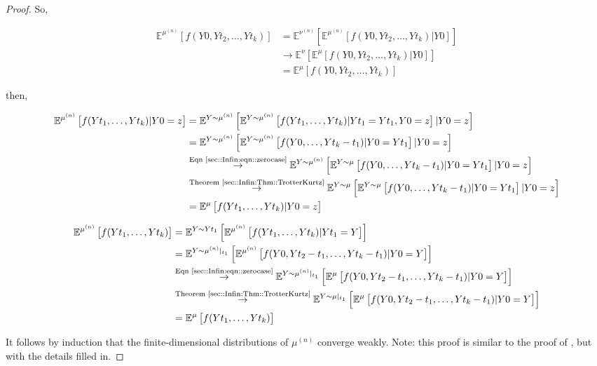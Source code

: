 \documentclass[12pt]{article}
\newcommand{\mb}{\mathbb}
\newcommand{\ra}{\rightarrow}
\newcommand{\os}{\overset}
\newcommand{\te}{\text}
\newcommand{\exmu}[2]{\mb{E}^{#1}\left[#2\right]}	%
\renewcommand{\t}{t}							%
\newcommand{\sln}[1]{^{(#1)}}						%
\newcommand{\indx}[1]{_{#1}}					%
\newcommand{\m}{\mu}							%
\newcommand{\mm}{\nu}							%
\newcommand{\XX}{Y}								%
\renewcommand{\it}{k}							%
\newcommand{\xxx}{z}							%
\begin{document}
\begin{proof}
So,

\begin{align*}
\exmu{\m\sln{n}}{f(\XX{}{0},\XX{}{\t\indx{2}},\dots,\XX{}{\t\indx{\it}})} &= \exmu{\mm\sln{n}}{\exmu{\m\sln{n}}{f(\XX{}{0},\XX{}{\t\indx{2}},\dots,\XX{}{\t\indx{\it}})|\XX{}{0}}}\\
&\ra \exmu{\mm}{\exmu{\m}{f(\XX{}{0},\XX{}{\t\indx{2}},\dots,\XX{}{\t\indx{\it}})|\XX{}{0}}}\\
&= \exmu{\m}{f(\XX{}{0},\XX{}{\t\indx{2}},\dots,\XX{}{\t\indx{\it}})}
\end{align*}

then,

\begin{align*}
\exmu{\m\sln{n}}{f(\XX{}{\t\indx{1}},\dots,\XX{}{\t\indx{\it}})|\XX{}{0}=\xxx}&=\exmu{\XX\sim\m\sln{n}}{\exmu{\XX\sim \m\sln{n}}{f(\XX{\t\indx{1}},\dots,\XX{\t\indx{\it}})|\XX{\t\indx{1}}=\XX{}{\t\indx{1}},\XX{0}=\xxx}|\XX{}{0}=\xxx}\\
&=\exmu{\XX\sim\m\sln{n}}{\exmu{\XX\sim \m\sln{n}}{f(\XX{0},\dots,\XX{\t\indx{\it}-\t\indx{1}})|\XX{0}=\XX{}{\t\indx{1}}}|\XX{}{0}=\xxx}\\
&\os{\te{Eqn \eqref{sec::Infin:eqn::zerocase}}}{\ra} \exmu{\XX\sim\m\sln{n}}{\exmu{\XX\sim \m}{f(\XX{0},\dots,\XX{\t\indx{\it}-\t\indx{1}})|\XX{0}=\XX{}{\t\indx{1}}}|\XX{}{0}=\xxx}\\
&\os{\te{Theorem \ref{sec::Infin:Thm::TrotterKurtz}}}{\ra} \exmu{\XX\sim\m}{\exmu{\XX\sim \m}{f(\XX{0},\dots,\XX{\t\indx{\it}-\t\indx{1}})|\XX{0}=\XX{}{\t\indx{1}}}|\XX{}{0}=\xxx}\\
&=\exmu{\m}{f(\XX{}{\t\indx{1}},\dots,\XX{}{\t\indx{\it}})|\XX{}{0}=\xxx}
\end{align*}

\begin{align*}
\exmu{\m\sln{n}}{f(\XX{}{\t\indx{1}},\dots,\XX{}{\t\indx{\it}})}&= \exmu{\XX\sim \XX{}{\t\indx{1}}}{\exmu{\m\sln{n}}{f(\XX{}{\t\indx{1}},\dots,\XX{}{\t\indx{\it}})|\XX{}{\t\indx{1}}=\XX}}\\
&=\exmu{\XX\sim \m\sln{n}|_{\t\indx{1}}}{\exmu{\m\sln{n}}{f(\XX{}{0},\XX{\t\indx{2}-\t\indx{1}},\dots,\XX{\t\indx{\it}-\t\indx{1}})|\XX{}{0}=\XX}}\\
&\os{\te{Eqn \eqref{sec::Infin:eqn::zerocase}}}{\ra} \exmu{\XX\sim \m\sln{n}|_{\t\indx{1}}}{\exmu{\m}{f(\XX{}{0},\XX{\t\indx{2}-\t\indx{1}},\dots,\XX{\t\indx{\it}-\t\indx{1}})|\XX{}{0}=\XX}}\\
&\os{\te{Theorem \ref{sec::Infin:Thm::TrotterKurtz}}}{\ra} \exmu{\XX\sim \m|_{\t\indx{1}}}{\exmu{\m}{f(\XX{}{0},\XX{\t\indx{2}-\t\indx{1}},\dots,\XX{\t\indx{\it}-\t\indx{1}})|\XX{}{0}=\XX}}\\
&=\exmu{\m}{f(\XX{}{\t\indx{1}},\dots,\XX{}{\t\indx{\it}})}
\end{align*}

It follows by induction that the finite-dimensional distributions of \(\m\sln{n}\) converge weakly. Note: this proof is similar to the proof of \cite[Theorem 4.2]{Kur81}, but with the details filled in.
\end{proof}
\end{document}
